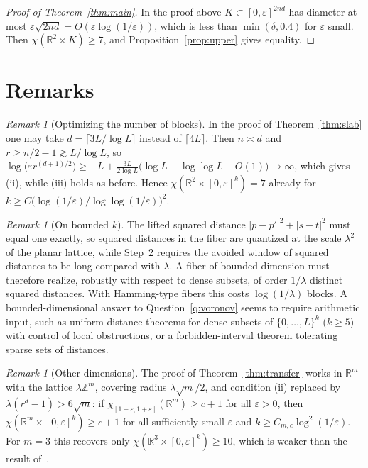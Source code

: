 \documentclass[11pt]{amsart}
\theoremstyle{definition}
\theoremstyle{remark}
\newtheorem{remark}[theorem]{Remark}
\newcommand{\R}{\mathbb{R}}
\newcommand{\Z}{\mathbb{Z}}
\begin{document}
\begin{proof}[Proof of Theorem~\ref{thm:main}]
In the proof above $K\subset[0,\varepsilon]^{2nd}$ has diameter at most
$\varepsilon\sqrt{2nd}=O(\varepsilon\log(1/\varepsilon))$, which is less than $\min(\delta,0.4)$
for $\varepsilon$ small. Then $\chi(\R^2\times K)\ge7$, and Proposition~\ref{prop:upper} gives
equality.
\end{proof}

\section{Remarks}

\begin{remark}[Optimizing the number of blocks]
In the proof of Theorem~\ref{thm:slab} one may take $d=\lceil 3L/\log L\rceil$ instead of
$\lceil4L\rceil$. Then $n\asymp d$ and $r\ge n/2-1\gtrsim L/\log L$, so
$\log\bigl(\varepsilon r^{(d+1)/2}\bigr)\ge -L+\tfrac{3L}{2\log L}\bigl(\log L-\log\log L-O(1)\bigr)
\to\infty$, which gives (ii), while (iii) holds as before. Hence
$\chi(\R^2\times[0,\varepsilon]^k)=7$ already for
$k\ge C\bigl(\log(1/\varepsilon)/\log\log(1/\varepsilon)\bigr)^2$.
\end{remark}

\begin{remark}[On bounded $k$]
The lifted squared distance $|p-p'|^2+|s-t|^2$ must equal one exactly, so squared distances in
the fiber are quantized at the scale $\lambda^2$ of the planar lattice, while Step~2 requires
the avoided window of squared distances to be long compared with $\lambda$. A fiber of bounded
dimension must therefore realize, robustly with respect to dense subsets, of order $1/\lambda$
distinct squared distances. With Hamming-type fibers this costs $\log(1/\lambda)$ blocks. A
bounded-dimensional answer to Question~\ref{q:voronov} seems to require arithmetic input, such
as uniform distance theorems for dense subsets of $\{0,\dots,L\}^k$ ($k\ge5$) with control of
local obstructions, or a forbidden-interval theorem tolerating sparse sets of distances.
\end{remark}

\begin{remark}[Other dimensions]
The proof of Theorem~\ref{thm:transfer} works in $\R^m$ with the lattice $\lambda\Z^m$, covering
radius $\lambda\sqrt m/2$, and condition (ii) replaced by $\lambda(r^d-1)>6\sqrt m$: if
$\chi_{[1-\varepsilon,1+\varepsilon]}(\R^m)\ge c+1$ for all $\varepsilon>0$, then
$\chi(\R^m\times[0,\varepsilon]^k)\ge c+1$ for all sufficiently small $\varepsilon$ and
$k\ge C_{m,c}\log^2(1/\varepsilon)$. For $m=3$ this recovers only
$\chi(\R^3\times[0,\varepsilon]^k)\ge10$, which is weaker than the result of~\cite{CKSV}.
\end{remark}
\end{document}
